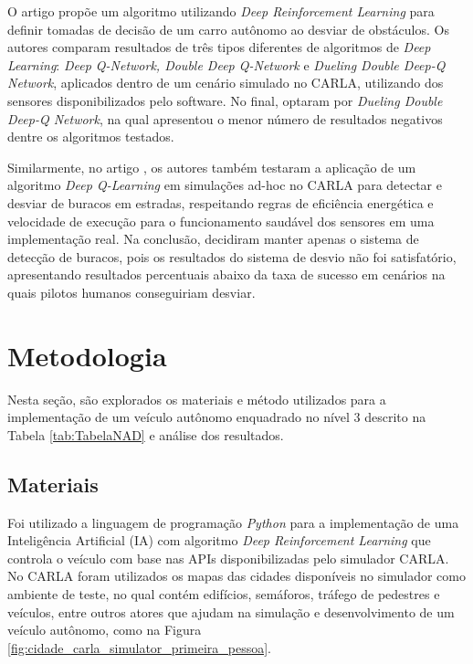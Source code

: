 \documentclass[a4paper,12pt,Times]{article}
\begin{document}
O artigo  propõe um algoritmo utilizando \textit{Deep Reinforcement Learning} para definir tomadas de decisão de um carro autônomo ao desviar de obstáculos. Os autores comparam resultados de três tipos diferentes de algoritmos de \textit{Deep Learning}: \textit{Deep Q-Network, Double Deep Q-Network} e \textit{Dueling Double Deep-Q Network}, aplicados dentro de um cenário simulado no CARLA, utilizando dos sensores disponibilizados pelo software. No final, optaram por \textit{Dueling Double Deep-Q Network}, na qual apresentou o menor número de resultados negativos dentre os algoritmos testados.

Similarmente, no artigo , os autores também testaram a aplicação de um algoritmo \textit{Deep Q-Learning} em simulações ad-hoc no CARLA para detectar e desviar de buracos em estradas, respeitando regras de eficiência energética e velocidade de execução para o funcionamento saudável dos sensores em uma implementação real. Na conclusão, decidiram manter apenas o sistema de detecção de buracos, pois os resultados do sistema de desvio não foi satisfatório, apresentando resultados percentuais abaixo da taxa de sucesso em cenários na quais pilotos humanos conseguiriam desviar.

\section{Metodologia}
Nesta seção, são explorados os materiais e método utilizados para a implementação
de um veículo autônomo enquadrado no nível 3 descrito na Tabela \ref{tab:TabelaNAD}
e análise dos resultados.

\subsection{Materiais}

Foi utilizado a linguagem de programação \textit{Python} para a implementação de uma Inteligência Artificial (IA) com algoritmo \textit{Deep Reinforcement Learning} que controla o veículo com base nas APIs disponibilizadas pelo simulador CARLA. No CARLA foram utilizados os mapas das cidades disponíveis no simulador como ambiente de teste, no qual contém edifícios, semáforos, tráfego  de pedestres e veículos, entre outros atores que ajudam na simulação e desenvolvimento de um veículo autônomo, como na Figura \ref{fig:cidade_carla_simulator_primeira_pessoa}.
\end{document}
